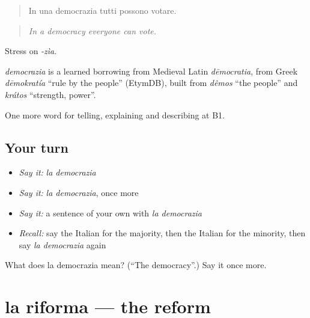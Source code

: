 \begin{quote}
In una democrazia tutti possono votare.
\end{quote}

\begin{quote}
\emph{In a democracy everyone can vote.}
\end{quote}

Stress on \emph{-zìa}.

\begin{cousinweb}
\emph{democrazia} is a learned borrowing from Medieval Latin \emph{dēmocratia}, from Greek \emph{dēmokratía} \textquotedblleft{}rule by the people\textquotedblright{} (EtymDB), built from \emph{dêmos} \textquotedblleft{}the people\textquotedblright{} and \emph{krátos} \textquotedblleft{}strength, power\textquotedblright{}.
\end{cousinweb}

\begin{grammarlens}[title={What you've built}]
One more word for telling, explaining and describing at B1.
\end{grammarlens}

\subsection*{Your turn}
\begin{itemize}
\raggedright
  \item \emph{Say it:} \emph{la democrazia}
  \item \emph{Say it:} \emph{la democrazia}, once more
  \item \emph{Say it:} a sentence of your own with \emph{la democrazia}
  \item \emph{Recall:} say the Italian for the majority, then the Italian for the minority, then say \emph{la democrazia} again
\end{itemize}

\begin{tcolorbox}[breakable,colback=teal!4,colframe=teal!35!black,title={Before you move on}]
What does la democrazia mean? (\textquotedblleft{}The democracy\textquotedblright{}.) Say it once more.
\end{tcolorbox}
\section[la riforma]{la riforma — the reform}

\label{lesson:IT-C370-riforma}



